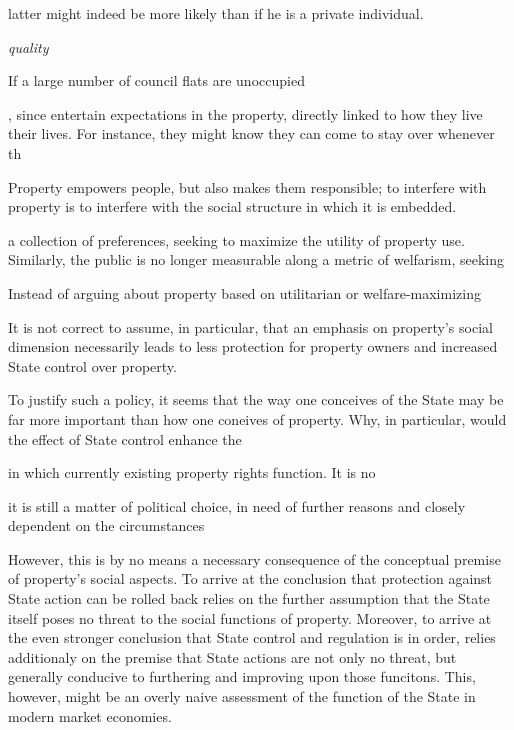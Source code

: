  latter might indeed be more likely than if he is a private individual.


 {\it quality} 

If a large number of council flats are unoccupied 




 , since  entertain expectations in the property, directly linked to how they live their lives. For instance, they might know they can come to stay over whenever th



 Property empowers people,  but also makes them responsible; to interfere with property is to interfere with the social structure in which it is embedded.

a collection of preferences, seeking to maximize the utility of property use. Similarly, the public is no longer measurable along a metric of welfarism, seeking 


Instead of arguing about property based on utilitarian or welfare-maximizing 






 It is not correct to assume, in particular, that an emphasis on property's social dimension necessarily leads to less protection for property owners and increased State control over property. 

To justify such a policy, it seems that the way one conceives of the State may be far more important than how one coneives of property. Why, in particular, would the effect of State control enhance the 

 in which currently existing property rights function. It is no 

it is still a matter of political choice, in need of further reasons and closely dependent on the circumstances 




 However, this is by no means a necessary consequence of the conceptual premise of property's social aspects. To arrive at the conclusion that protection against State action can be rolled back relies on the further assumption that the State itself poses no threat to the social functions of property. Moreover, to arrive at the even stronger conclusion that State control and regulation is in order, relies additionaly on the premise that State actions are not only no threat, but generally conducive to furthering and improving upon those funcitons. This, however, might be an overly naive assessment of the function of the State in modern market economies.


